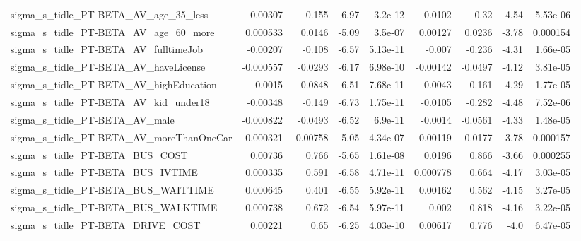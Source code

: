 \begin{tabular}{lrrrrrrrr}
sigma\_s\_tidle\_PT-BETA\_AV\_age\_35\_less               &    -0.00307 &       -0.155 &    -6.97 &  3.2e-12 &    -0.0102 &       -0.32 &        -4.54 &      5.53e-06 \\
sigma\_s\_tidle\_PT-BETA\_AV\_age\_60\_more               &    0.000533 &       0.0146 &    -5.09 &  3.5e-07 &    0.00127 &      0.0236 &        -3.78 &      0.000154 \\
sigma\_s\_tidle\_PT-BETA\_AV\_fulltimeJob               &    -0.00207 &       -0.108 &    -6.57 & 5.13e-11 &     -0.007 &      -0.236 &        -4.31 &      1.66e-05 \\
sigma\_s\_tidle\_PT-BETA\_AV\_haveLicense               &   -0.000557 &      -0.0293 &    -6.17 & 6.98e-10 &   -0.00142 &     -0.0497 &        -4.12 &      3.81e-05 \\
sigma\_s\_tidle\_PT-BETA\_AV\_highEducation             &     -0.0015 &      -0.0848 &    -6.51 & 7.68e-11 &    -0.0043 &      -0.161 &        -4.29 &      1.77e-05 \\
sigma\_s\_tidle\_PT-BETA\_AV\_kid\_under18               &    -0.00348 &       -0.149 &    -6.73 & 1.75e-11 &    -0.0105 &      -0.282 &        -4.48 &      7.52e-06 \\
sigma\_s\_tidle\_PT-BETA\_AV\_male                      &   -0.000822 &      -0.0493 &    -6.52 &  6.9e-11 &    -0.0014 &     -0.0561 &        -4.33 &      1.48e-05 \\
sigma\_s\_tidle\_PT-BETA\_AV\_moreThanOneCar            &   -0.000321 &     -0.00758 &    -5.05 & 4.34e-07 &   -0.00119 &     -0.0177 &        -3.78 &      0.000157 \\
sigma\_s\_tidle\_PT-BETA\_BUS\_COST                     &     0.00736 &        0.766 &    -5.65 & 1.61e-08 &     0.0196 &       0.866 &        -3.66 &      0.000255 \\
sigma\_s\_tidle\_PT-BETA\_BUS\_IVTIME                   &    0.000335 &        0.591 &    -6.58 & 4.71e-11 &   0.000778 &       0.664 &        -4.17 &      3.03e-05 \\
sigma\_s\_tidle\_PT-BETA\_BUS\_WAITTIME                 &    0.000645 &        0.401 &    -6.55 & 5.92e-11 &    0.00162 &       0.562 &        -4.15 &      3.27e-05 \\
sigma\_s\_tidle\_PT-BETA\_BUS\_WALKTIME                 &    0.000738 &        0.672 &    -6.54 & 5.97e-11 &      0.002 &       0.818 &        -4.16 &      3.22e-05 \\
sigma\_s\_tidle\_PT-BETA\_DRIVE\_COST                   &     0.00221 &         0.65 &    -6.25 & 4.03e-10 &    0.00617 &       0.776 &         -4.0 &      6.47e-05 \\

\end{tabular}
